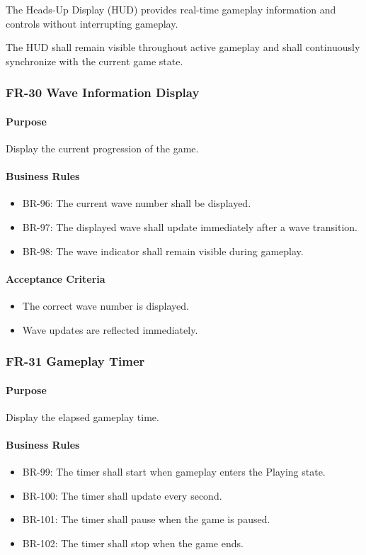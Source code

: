\documentclass[11pt,a4paper]{article}
\begin{document}
The Heads-Up Display (HUD) provides real-time gameplay information and controls
without interrupting gameplay.

The HUD shall remain visible throughout active gameplay and shall continuously
synchronize with the current game state.

\subsubsection{FR-30 Wave Information Display}

\paragraph{Purpose}
Display the current progression of the game.

\paragraph{Business Rules}
\begin{itemize}
  \item BR-96: The current wave number shall be displayed.
  \item BR-97: The displayed wave shall update immediately after a wave
        transition.
  \item BR-98: The wave indicator shall remain visible during gameplay.
\end{itemize}

\paragraph{Acceptance Criteria}
\begin{itemize}
  \item The correct wave number is displayed.
  \item Wave updates are reflected immediately.
\end{itemize}

\subsubsection{FR-31 Gameplay Timer}

\paragraph{Purpose}
Display the elapsed gameplay time.

\paragraph{Business Rules}
\begin{itemize}
  \item BR-99: The timer shall start when gameplay enters the Playing state.
  \item BR-100: The timer shall update every second.
  \item BR-101: The timer shall pause when the game is paused.
  \item BR-102: The timer shall stop when the game ends.
\end{itemize}
\end{document}
